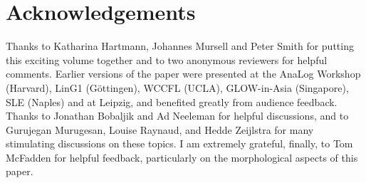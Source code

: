 \documentclass[output=paper, modfonts, nonflat]{langsci/langscibook}
\begin{document}
      
\section*{Acknowledgements}

Thanks to Katharina Hartmann, Johannes Mursell and Peter Smith for
putting this exciting volume together and to two anonymous reviewers
for helpful comments.  Earlier versions of the paper were presented at
the AnaLog Workshop (Harvard), LinG1 (G\"ottingen), WCCFL (UCLA),
GLOW-in-Asia (Singapore), SLE (Naples) and at Leipzig, and benefited
greatly from audience feedback. Thanks to Jonathan Bobaljik and Ad
Neeleman for helpful discussions, and to Gurujegan Murugesan, Louise
Raynaud, and Hedde Zeijlstra for many stimulating discussions on these
topics.  I am extremely grateful, finally, to Tom McFadden for helpful
feedback, particularly on the morphological aspects of this paper.

{\sloppy
	\printbibliography[heading=subbibliography,notkeyword=this]
}
\end{document}
